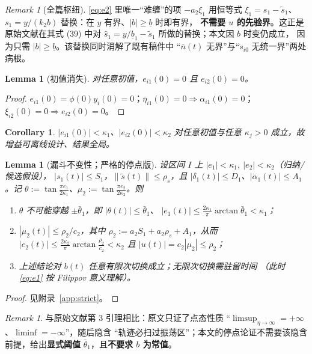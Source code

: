 \documentclass[11pt,a4paper]{article}
\newcommand{\ub}{\underline{b}}
\theoremstyle{plain}
\newtheorem{lemma}[theorem]{Lemma}
\newtheorem{corollary}[theorem]{Corollary}
\theoremstyle{definition}
\theoremstyle{remark}
\newtheorem{remark}[theorem]{Remark}
\begin{document}
\begin{remark}[全篇枢纽]
\eqref{eq:e2} 里唯一“难缠”的项 $-a_2\xi_1$ 用恒等式
$\xi_1=s_1-\tilde s_1$、$s_1=y/(k_2b)$ 替换：在 $y$ 有界、$|b|\ge\ub$ 时即有界，
\textbf{不需要 $u$ 的先验界}。这正是原始文献在其式 (39) 中对
$\hat s_1=y/\underline b_1-\tilde s_1$ 所做的替换；本文因 $b$ 时变仍成立，
因为只需 $|b|\ge\ub$。该替换同时消解了既有稿件中
“$\bar n(t)$ 无界”与“$\dot s_{i0}$ 无统一界”两处病根。
\end{remark}

\begin{lemma}[初值消失]\label{lem:init}
对任意初值，$e_{i1}(0)=0$ 且 $e_{i2}(0)=0$。
\end{lemma}
\begin{proof}
$e_{i1}(0)=\phi(0)y_i(0)=0$；$\bar\eta_{i1}(0)=0\Rightarrow\alpha_{i1}(0)=0$；
$\xi_{i2}(0)=0\Rightarrow e_{i2}(0)=0$。
\end{proof}

\begin{corollary}\label{cor:global}
$|e_{i1}(0)|<\kappa_1$、$|e_{i2}(0)|<\kappa_2$ 对\emph{任意}初值与\emph{任意}
$\kappa_j>0$ 成立，故增益可离线设计、结果全局。
\end{corollary}

\begin{lemma}[漏斗不变性；严格的停点版]\label{lem:funnel}
设区间 $I$ 上 $|e_1|<\kappa_1,\ |e_2|<\kappa_2$（归纳/候选假设），
$|s_1(t)|\le S_1$，$\|\tilde s(t)\|\le\rho_s$，且
$|\delta_1(t)|\le D_1$、$|\dot\alpha_1(t)|\le A_1$。记
$\theta:=\tan\frac{\pi e_1}{2\kappa_1}$、$\mu_2:=\tan\frac{\pi e_2}{2\kappa_2}$。则
\begin{enumerate}[label=\textup{(\alph*)}]
\item $\theta$ 不可能穿越 $\pm\bar\theta_1$，即
$|\theta(t)|\le\bar\theta_1$、
$|e_1(t)|\le\frac{2\kappa_1}{\pi}\arctan\bar\theta_1<\kappa_1$；
\item $|\mu_2(t)|\le\rho_2/c_2$，其中 $\rho_2:=a_2S_1+a_2\rho_s+A_1$，从而
$|e_2(t)|\le\frac{2\kappa_2}{\pi}\arctan\frac{\rho_2}{c_2}<\kappa_2$ 且
$|u(t)|=c_2|\mu_2|\le\rho_2$；
\item 上述结论对 $b(t)$ 任意有限次切换成立；无限次切换需驻留时间
（此时 \eqref{eq:e1} 按 Filippov 意义理解）。
\end{enumerate}
\end{lemma}
\begin{proof}
见附录~\ref{app:strict}。
\end{proof}

\begin{remark}
与原始文献第 3 引理相比：原文只证了点态性质
“$\limsup_{\eta\to\infty}=+\infty$、$\liminf=-\infty$”，随后隐含
“轨迹必扫过振荡区”；本文的停点论证不需要该隐含前提，给出\textbf{显式阈值}
$\bar\theta_1$，且\textbf{不要求 $b$ 为常值}。
\end{remark}
\end{document}
